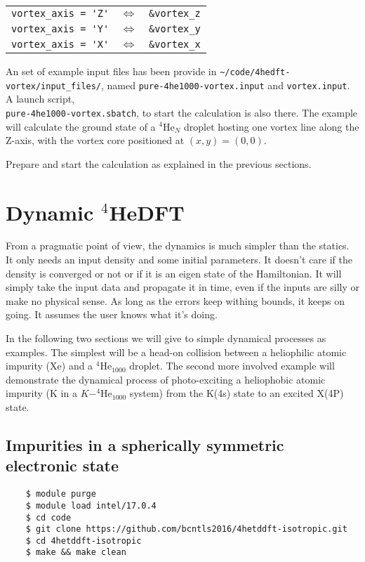 \documentclass[10pt,a4paper]{article}
\begin{document}
	\begin{tabular}{ccc}
	\verb|vortex_axis = 'Z'|	& $\Longleftrightarrow$ & \verb|&vortex_z| \\
	\verb|vortex_axis = 'Y'|	& $\Longleftrightarrow$ & \verb|&vortex_y| \\
	\verb|vortex_axis = 'X'|	& $\Longleftrightarrow$ & \verb|&vortex_x| \\
	\end{tabular}

 	An set of example input files has been provide in \verb|~/code/4hedft-vortex/input_files/|, named \verb|pure-4he1000-vortex.input| and \verb|vortex.input|. A launch script,\\ \verb|pure-4he1000-vortex.sbatch|, to start the calculation is also there. The example will calculate the ground state of a $^4$He$_N$ droplet hosting one vortex line along the Z-axis, with the vortex core positioned at $(x,y)=(0,0)$.
 	
 	Prepare and start the calculation as explained in the previous sections.
	
	\newpage
	
	\section{Dynamic $^4$HeDFT}
	From a pragmatic point of view, the dynamics is much simpler than the statics. It only needs an input density and some initial parameters. It doesn't care if the density is converged or not or if it is an eigen state of the Hamiltonian. It will simply take the input data and propagate it in time, even if the inputs are silly or make no physical sense. As long as the errors keep withing bounds, it keeps on going. It assumes the user knows what it's doing.
	
	In the following two sections we will give to simple dynamical processes as examples. The simplest will be a head-on collision between a heliophilic atomic impurity (Xe) and a $^4$He$_{1000}$ droplet. The second more involved example will demonstrate the dynamical process of photo-exciting a heliophobic atomic impurity (K in a $K-^4$He$_{1000}$ system) from the K(4s) state to an excited X(4P) state.
	
	\subsection{Impurities in a spherically symmetric electronic state}
	\begin{verbatim}
	$ module purge
	$ module load intel/17.0.4
	$ cd code
	$ git clone https://github.com/bcntls2016/4hetddft-isotropic.git
	$ cd 4hetddft-isotropic
	$ make && make clean
	\end{verbatim}
	
\end{document}
